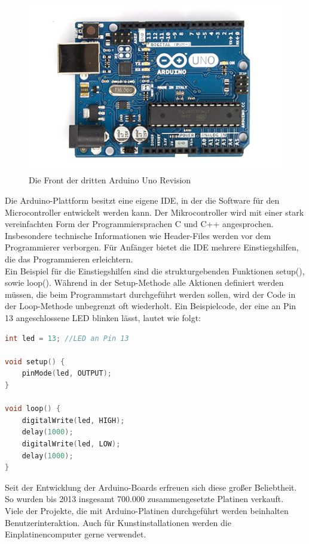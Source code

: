 \begin{figure}[H] 
	\centering
	\includegraphics[scale=0.6]{Bilder/arduinouno}
	\caption{Die Front der dritten Arduino Uno Revision\cite{i:arduinouno}}
	\label{f:tree}
\end{figure}

Die Arduino-Plattform besitzt eine eigene \ac{IDE}, in der die Software für den Microcontroller entwickelt werden kann. Der Mikrocontroller wird mit einer stark vereinfachten Form der Programmiersprachen C und C++ angesprochen. Insbesondere technische Informationen wie Header-Files werden vor dem Programmierer verborgen. Für Anfänger bietet die \ac{IDE} mehrere Einstiegshilfen, die das Programmieren erleichtern.\\
Ein Beispiel für die Einstiegshilfen sind die strukturgebenden Funktionen setup(), sowie loop(). Während in der Setup-Methode alle Aktionen definiert werden müssen, die beim Programmstart durchgeführt werden sollen, wird der Code in der Loop-Methode unbegrenzt oft wiederholt.
Ein Beispielcode, der eine an Pin 13 angeschlossene LED blinken lässt, lautet wie folgt:\\

\begin{lstlisting}[language=c,caption={Simpler Arduino-Code, der eine LED blinken lässt},label=lst:blink,frame=single] 
int led = 13; //LED an Pin 13

void setup() {                
	pinMode(led, OUTPUT);     
}

void loop() {
	digitalWrite(led, HIGH);  
	delay(1000);               
	digitalWrite(led, LOW);   
	delay(1000);               
}
\end{lstlisting}

\vspace{1cm}

Seit der Entwicklung der Arduino-Boards erfreuen sich diese großer Beliebtheit. So wurden bis 2013 insgesamt 700.000 zusammengesetzte Platinen verkauft\cite{ws:sellnumb}.\\

Viele der Projekte, die mit Arduino-Platinen durchgeführt werden beinhalten Benutzerinteraktion. Auch für Kunstinstallationen werden die Einplatinencomputer gerne verwendet\cite{ws:elektor}.

